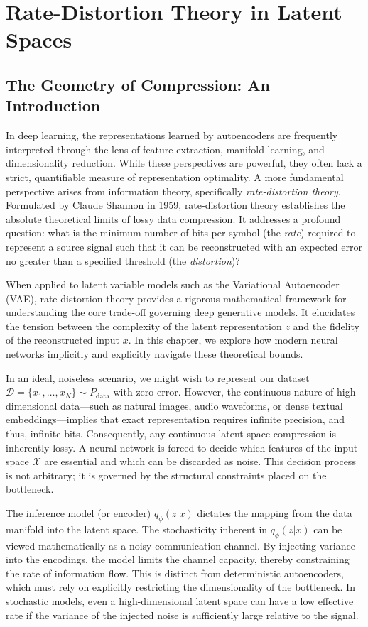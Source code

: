 \chapter{Rate-Distortion Theory in Latent Spaces}
\label{ch:rate_distortion}

\section{The Geometry of Compression: An Introduction}

In deep learning, the representations learned by autoencoders are frequently interpreted through the lens of feature extraction, manifold learning, and dimensionality reduction. While these perspectives are powerful, they often lack a strict, quantifiable measure of representation optimality. A more fundamental perspective arises from information theory, specifically \emph{rate-distortion theory}. Formulated by Claude Shannon in 1959, rate-distortion theory establishes the absolute theoretical limits of lossy data compression. It addresses a profound question: what is the minimum number of bits per symbol (the \emph{rate}) required to represent a source signal such that it can be reconstructed with an expected error no greater than a specified threshold (the \emph{distortion})?

When applied to latent variable models such as the Variational Autoencoder (VAE), rate-distortion theory provides a rigorous mathematical framework for understanding the core trade-off governing deep generative models. It elucidates the tension between the complexity of the latent representation $z$ and the fidelity of the reconstructed input $x$. In this chapter, we explore how modern neural networks implicitly and explicitly navigate these theoretical bounds.

In an ideal, noiseless scenario, we might wish to represent our dataset $\mathcal{D} = \{x_1, \dots, x_N\} \sim P_{\text{data}}$ with zero error. However, the continuous nature of high-dimensional data—such as natural images, audio waveforms, or dense textual embeddings—implies that exact representation requires infinite precision, and thus, infinite bits. Consequently, any continuous latent space compression is inherently lossy. A neural network is forced to decide which features of the input space $\mathcal{X}$ are essential and which can be discarded as noise. This decision process is not arbitrary; it is governed by the structural constraints placed on the bottleneck.

The inference model (or encoder) $q_\phi(z|x)$ dictates the mapping from the data manifold into the latent space. The stochasticity inherent in $q_\phi(z|x)$ can be viewed mathematically as a noisy communication channel. By injecting variance into the encodings, the model limits the channel capacity, thereby constraining the rate of information flow. This is distinct from deterministic autoencoders, which must rely on explicitly restricting the dimensionality of the bottleneck. In stochastic models, even a high-dimensional latent space can have a low effective rate if the variance of the injected noise is sufficiently large relative to the signal.

